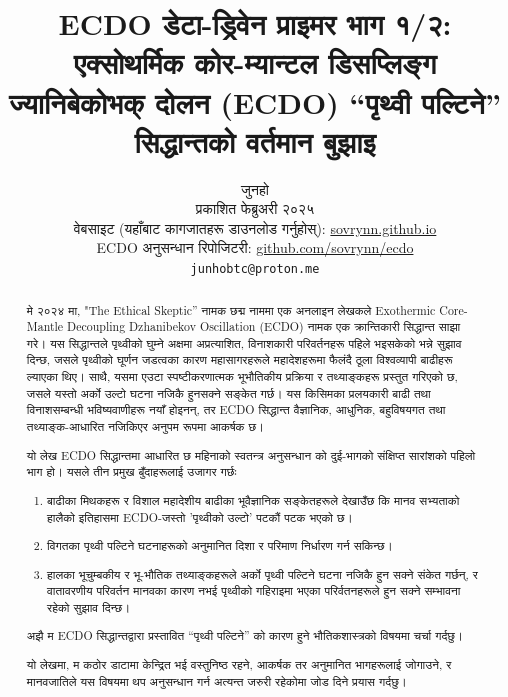\documentclass[10pt,twocolumn,letterpaper]{article}
\begin{document}
\title{ECDO डेटा-ड्रिवेन प्राइमर भाग १/२: एक्सोथर्मिक कोर-म्यान्टल डिसप्लिङ्ग ज्यानिबेकोभक् दोलन (ECDO) “पृथ्वी पल्टिने” सिद्धान्तको वर्तमान बुझाइ}

\author{जुनहो\\
प्रकाशित फेब्रुअरी २०२५\\
वेबसाइट (यहाँबाट कागजातहरू डाउनलोड गर्नुहोस्): \href{https://sovrynn.github.io}{sovrynn.github.io}\\
ECDO अनुसन्धान रिपोजिटरी: \href{https://github.com/sovrynn/ecdo}{github.com/sovrynn/ecdo}\\
{\tt\small junhobtc@proton.me}
}

\maketitle

\begin{abstract}
मे २०२४ मा, "The Ethical Skeptic” \cite{0} नामक छद्म नाममा एक अनलाइन लेखकले Exothermic Core-Mantle Decoupling Dzhanibekov Oscillation (ECDO) \cite{1} नामक एक क्रान्तिकारी सिद्धान्त साझा गरे। यस सिद्धान्तले पृथ्वीको घुम्ने अक्षमा अप्रत्याशित, विनाशकारी परिवर्तनहरू पहिले भइसकेको भन्ने सुझाव दिन्छ, जसले पृथ्वीको घूर्णन जडत्वका कारण महासागरहरूले महादेशहरूमा फैलंदै ठूला विश्वव्यापी बाढीहरू ल्याएका थिए। साथै, यसमा एउटा स्पष्टीकरणात्मक भूभौतिकीय प्रक्रिया र तथ्याङ्कहरू प्रस्तुत गरिएको छ, जसले यस्तो अर्को उल्टो घटना नजिकै हुनसक्ने सङ्केत गर्छ। यस किसिमका प्रलयकारी बाढी तथा विनाशसम्बन्धी भविष्यवाणीहरू नयाँ होइनन्, तर ECDO सिद्धान्त वैज्ञानिक, आधुनिक, बहुविषयगत तथा तथ्याङ्क-आधारित नजिकिएर अनुपम रूपमा आकर्षक छ।

यो लेख ECDO सिद्धान्तमा आधारित छ महिनाको स्वतन्त्र अनुसन्धान \cite{2,20} को दुई-भागको संक्षिप्त सारांशको पहिलो भाग हो। यसले तीन प्रमुख बुँदाहरूलाई उजागर गर्छः

\begin{flushleft}
\begin{enumerate}
    \item बाढीका मिथकहरू र विशाल महादेशीय बाढीका भूवैज्ञानिक सङ्केतहरूले देखाउँछ कि मानव सभ्यताको हालैको इतिहासमा ECDO-जस्तो 'पृथ्वीको उल्टो' पटकौं पटक भएको छ।

\item विगतका पृथ्वी पल्टिने घटनाहरूको अनुमानित दिशा र परिमाण निर्धारण गर्न सकिन्छ।
\item हालका भूचुम्बकीय र भू-भौतिक तथ्याङ्कहरूले अर्को पृथ्वी पल्टिने घटना नजिकै हुन सक्ने संकेत गर्छन्, र वातावरणीय परिवर्तन मानवका कारण नभई पृथ्वीको गहिराइमा भएका परिर्वतनहरूले हुन सक्ने सम्भावना रहेको सुझाव दिन्छ।
\end{enumerate}
\end{flushleft}

अझै म ECDO सिद्धान्तद्वारा प्रस्तावित “पृथ्वी पल्टिने” को कारण हुने भौतिकशास्त्रको विषयमा चर्चा गर्दछु।

यो लेखमा, म कठोर डाटामा केन्द्रित भई वस्तुनिष्ठ रहने, आकर्षक तर अनुमानित भागहरूलाई जोगाउने, र मानवजातिले यस विषयमा थप अनुसन्धान गर्न अत्यन्त जरुरी रहेकोमा जोड दिने प्रयास गर्दछु।
\end{abstract}
\end{document}
